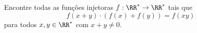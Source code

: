 Encontre todas as funções injetoras $f: \RR^* \to \RR^*$ tais que
$$f(x+y)\cdot(f(x)+f(y))=f(xy)$$
para todos $x, y \in \RR^*$ com $x+y \neq 0$.
